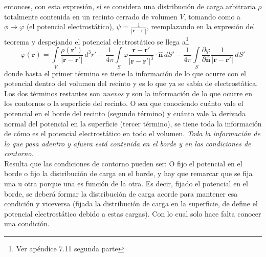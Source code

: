 entonces, con esta expresión, si se considera una distribución de carga arbitraria $\rho$ totalmente contenida en un recinto cerrado de volumen $V$, tomando como a $\phi\longrightarrow \varphi$ (el potencial electrostático), $\psi = \frac{1}{|\textbf{r}-\textbf{r}'|}$, reemplazando en la expresión del teorema y despejando el potencial electrostático se llega a\footnote{Ver apéndice 7.11 segunda parte}
\begin{equation*}
    \varphi(\textbf{r}) = 
    \int\limits_{V}
    \frac{\rho(\textbf{r}')}{|\textbf{r}-\textbf{r}'|}\,d^{3}r'
    -\frac{1}{4\pi}
    \int\limits_{S}
    \varphi \frac{\textbf{r}-\textbf{r}'}{|\textbf{r}-\textbf{r}'|^{3}}\cdot\hat{\textbf{n}}\,dS'
    -
    \frac{1}{4\pi}
    \int\limits_{S}
    \frac{\partial \varphi}{\partial \hat{\textbf{n}}}
    \frac{1}{|\textbf{r}-\textbf{r}'|}\,dS'
\end{equation*}
donde hasta el primer término se tiene la información de lo que ocurre con el potencial dentro del volumen del recinto y es lo que ya se sabía de electrostática. Los dos términos restantes son \textit{nuevos} y son la información de lo que ocurre en los contornos o la superficie del recinto. O sea que conociendo cuánto vale el potencial en el borde del recinto (segundo término) y cuánto vale la derivada normal del potencial en la superficie (tercer término), se tiene toda la información de cómo es el potencial electrostático en todo el volumen. \textit{Toda la información de lo que pasa adentro y afuera está contenida en el borde y en las condiciones de contorno.}\\
\indent Resulta que las condiciones de contorno pueden ser: O fijo el potencial en el borde o fijo la distribución de carga en el borde, y hay que remarcar que se fija una u otra porque una es función de la otra. Es decir, fijado el potencial en el borde, se deberá formar la distribución de carga acorde para mantener esa condición y viceversa (fijada la distribución de carga en la superficie, de define el potencial electrostático debido a estas cargas). Con lo cual solo hace falta conocer una condición.




